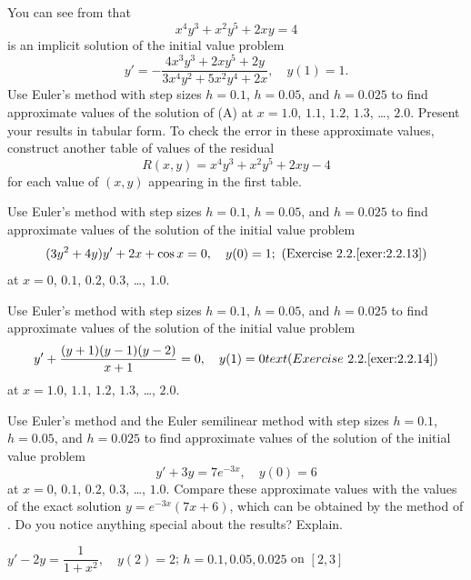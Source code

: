 \begin{exerciselist}
\item\label{exer:3.1.10}\Cex
You can see from  that
\[
x^4y^3+x^2y^5+2xy=4
\]
is an implicit solution of  the initial value problem
\[
y'=-\frac{4x^3y^3+2xy^5+2y}{3x^4y^2+5x^2y^4+2x},\quad y(1)=1.\tag{A}
\]
Use Euler's method with step sizes $h=0.1$, $h=0.05$, and $h=0.025$ to
find approximate values of the solution of (A) at
$x=1.0$, $1.1$, $1.2$, $1.3$, \dots, $2.0$. Present your results in tabular
form.
To check the error in these approximate values, construct another
table of values of the residual
\[
R(x,y)=x^4y^3+x^2y^5+2xy-4
\]
for each value of $(x,y)$ appearing in the first table.

\item\label{exer:3.1.11}\Cex
Use Euler's method with step sizes $h=0.1$, $h=0.05$, and $h=0.025$ to
find approximate values of the solution of the initial value problem
\[
(3y^2+4y)y'+2x+\cos x=0, \quad y(0)=1;
\text{ (Exercise~2.2.\ref{exer:2.2.13})}
\]
at $x=0$, $0.1$, $0.2$, $0.3$, \dots, $1.0$.


\item\label{exer:3.1.12}\Cex
Use Euler's method with step sizes $h=0.1$, $h=0.05$, and $h=0.025$ to
find approximate values of the solution of the initial value problem
\[
y'+\frac{(y+1)(y-1)(y-2)}{x+1}=0, \quad y(1)=0
\\text{ (Exercise~2.2.\ref{exer:2.2.14})}
\]
at $x=1.0$, $1.1$, $1.2$, $1.3$, \dots, $2.0$.


\item\label{exer:3.1.13}\Cex
Use Euler's method and the Euler semilinear method with step sizes
$h=0.1$, $h=0.05$, and $h=0.025$ to find approximate values of the
solution of the initial value problem
\[
y'+3y=7e^{-3x},\quad y(0)=6
\]
at $x=0$, $0.1$, $0.2$, $0.3$, \dots, $1.0$. Compare these approximate
values with
the values of the exact solution $y=e^{-3x}(7x+6)$, which can be
obtained by the method of . Do you notice
anything special about the results? Explain.


\item\label{exer:3.1.14}\Cex
$y'-2y=\dfrac{1}{1+x^2},\quad y(2)=2$;  \;
$h=0.1,0.05,0.025$ on $[2,3]$




\end{exerciselist}
